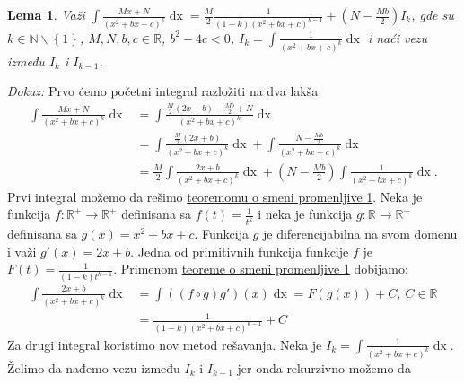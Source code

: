 \documentclass{article}
\newtheorem{lema}{Lema}[section]
\DeclareMathOperator{\dx}{dx}
\begin{document}
\begin{lemabox}
    \label{lema_1.4}
    \begin{lema}
        Važi $\displaystyle\int \frac{Mx+N}{\left(x^2+bx+c\right)^k}\dx=\frac{M}{2}\frac{1}{\left(1-k\right)\left(x^2+bx+c\right)^{k-1}}+\left(N-\frac{Mb}{2}\right)I_k$, gde su $k\in\mathbb{N}\backslash\left\{1\right\}$,
        $M,N,b,c\in\mathbb{R}$, $b^2 - 4c < 0$, $\displaystyle I_k=\int\frac{1}{\left(x^2+bx+c\right)^k}\dx$ i naći vezu između $I_k$ i $I_{k-1}$.
    \end{lema}
\end{lemabox}

\textit{Dokaz:} Prvo ćemo početni integral razložiti na dva lakša
\begin{align*}
    \int \frac{Mx+N}{\left(x^2+bx+c\right)^k}\dx & =\int \frac{\frac{M}{2}\left(2x+b\right)-\frac{Mb}{2}+N}{\left(x^2+bx+c\right)^k}\dx                                          \\
                                                 & =\int \frac{\frac{M}{2}\left(2x+b\right)}{\left(x^2+bx+c\right)^k}\dx+\int\frac{N-\frac{Mb}{2}}{\left(x^2+bx+c\right)^k}\dx   \\
                                                 & =\frac{M}{2}\int \frac{2x+b}{\left(x^2+bx+c\right)^k}\dx+\left(N-\frac{Mb}{2}\right)\int\frac{1}{\left(x^2+bx+c\right)^k}\dx.
\end{align*}
Prvi integral možemo da rešimo \hyperref[teorema_1.2]{teoremomu o smeni promenljive 1}. Neka je
funkcija $f: \mathbb{R}^{+}\longrightarrow\mathbb{R}^{+}$ definisana sa
$\displaystyle f\left(t\right)=\frac{1}{t^k}$ i neka je funkcija $g: \mathbb{R}\longrightarrow\mathbb{R}^{+}$
definisana sa $g\left(x\right)=x^2+bx+c$. Funkcija $g$ je diferencijabilna na svom domenu
i važi $g'\left(x\right)=2x+b$. Jedna od primitivnih funkcija funkcije $f$ je $\displaystyle F\left(t\right)=\frac{1}{\left(1-k\right)t^{k-1}}$.
Primenom \hyperref[teorema_1.2]{teoreme o smeni promenljive 1} dobijamo:
\begin{align*}
    \int \frac{2x+b}{\left(x^2+bx+c\right)^k}\dx & =\int\left(\left(f\circ g\right)g'\right)\left(x\right)\dx=F\left(g\left(x\right)\right)+C,\ C\in\mathbb{R} \\
                                                 & =\frac{1}{\left(1-k\right)\left(x^2+bx+c\right)^{k-1}}+C
\end{align*}
Za drugi integral koristimo nov metod rešavanja.
Neka je $\displaystyle I_k=\int\frac{1}{\left(x^2+bx+c\right)^k}\dx$. Želimo da nađemo vezu
između $I_k$ i $I_{k-1}$ jer onda rekurzivno možemo da
\end{document}
